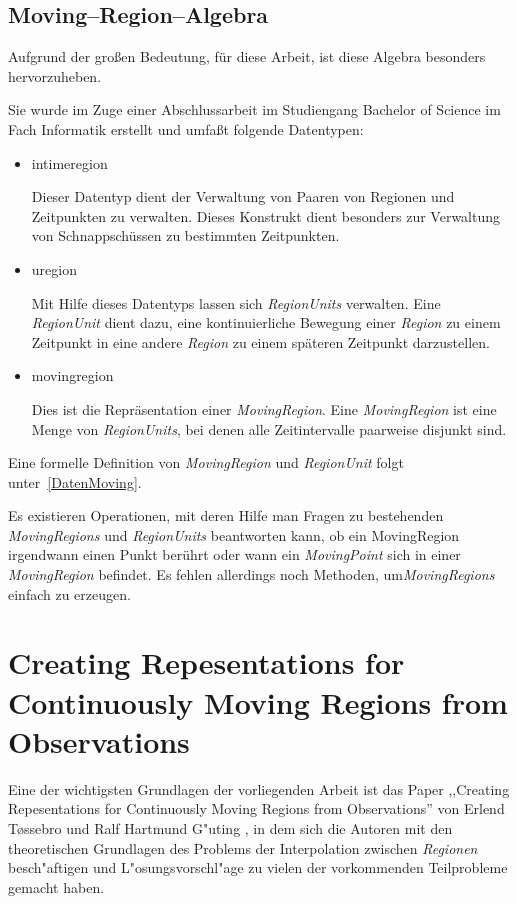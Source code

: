 \subsection{Moving--Region--Algebra}
Aufgrund der großen Bedeutung, für diese Arbeit, ist diese Algebra besonders hervorzuheben.

Sie wurde im Zuge einer Abschlussarbeit \cite{Mue} im Studiengang Bachelor of Science im Fach Informatik  erstellt und umfaßt folgende Datentypen:

\begin{itemize}
\item intimeregion

Dieser Datentyp dient der Verwaltung von Paaren von Regionen und Zeitpunkten zu verwalten. Dieses Konstrukt dient besonders zur Verwaltung von Schnappschüssen zu bestimmten Zeitpunkten.
\item uregion

Mit Hilfe dieses Datentyps lassen sich \textit{RegionUnits} verwalten. Eine \textit{RegionUnit} dient dazu, eine kontinuierliche Bewegung einer \textit{Region} zu einem Zeitpunkt in eine andere \textit{Region} zu einem späteren Zeitpunkt darzustellen. 
\item movingregion

Dies ist die Repräsentation einer \textit{MovingRegion}. Eine \textit{MovingRegion} ist eine Menge von \textit{RegionUnits}, bei denen alle Zeitintervalle paarweise disjunkt sind. 
\end{itemize}

Eine formelle Definition von \textit{MovingRegion} und \textit{RegionUnit} folgt unter~\vref{DatenMoving}.

Es existieren Operationen, mit deren Hilfe man Fragen zu bestehenden \textit{MovingRegions} und \textit{RegionUnits} beantworten kann, ob ein MovingRegion irgendwann einen Punkt berührt oder wann ein \textit{MovingPoint} sich in einer \textit{MovingRegion} befindet. Es fehlen allerdings noch Methoden, um\textit{MovingRegions}  einfach zu erzeugen. 
 
\section{Creating Repesentations for Continuously Moving Regions from Observations}\label{Tossebro}

Eine der wichtigsten Grundlagen der vorliegenden Arbeit ist das Paper ,,Creating Repesentations for Continuously Moving Regions from Observations'' \cite{TG} von Erlend T\o{}ssebro und Ralf Hartmund G"uting \cite{TG}, in dem sich die Autoren mit den theoretischen Grundlagen des Problems der Interpolation zwischen \textit{Regionen} besch"aftigen und L"osungsvorschl"age zu vielen der vorkommenden Teilprobleme gemacht haben.

